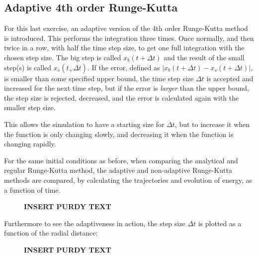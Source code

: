 \documentclass[a4paper,10pt]{article} 	%
\numberwithin{equation}{section}
\begin{document}
	\subsection{Adaptive 4th order Runge-Kutta}
	For this last exercise, an adaptive version of the 4th order Runge-Kutta method is introduced. This performs the integration three times. Once normally, and then twice in a row, with half the time step size, to get one full integration with the chosen step size. The big step is called $ x_b(t+\Delta t) $ and the result of the small step(s) is called $ x_s(t_+\Delta t) $. If the error, defined as $ |x_b(t+\Delta t)-x_s(t+\Delta t) |$, is smaller than some specified upper bound, the time step size $ \Delta t $ is accepted and increased for the next time step, but if the error is \textit{larger} than the upper bound, the step size is rejected, decreased, and the error is calculated again with the smaller step size.
	
	This allows the simulation to have a starting size for $ \Delta t $, but to increase it when the function is only changing slowly, and decreasing it when the function is changing rapidly. 
	
	For the same initial conditions as before, when comparing the analytical and regular Runge-Kutta method, the adaptive and non-adaptive Runge-Kutta methods are compared, by calculating the trajectories and evolution of energy, as a function of time.
	\begin{figure}[H]
		\centering
		\caption{\textbf{INSERT PURDY TEXT}}
		\label{fig:KeplerAdaptive}
	\end{figure}
	
	Furthermore to see the adaptiveness in action, the step size $ \Delta t$ is plotted as a function of the radial distance:
	
	\begin{figure}[H]
		\centering
		\caption{\textbf{INSERT PURDY TEXT}}
		\label{fig:KeplerAdaptiveDT}
	\end{figure}
	
	
\end{document}
